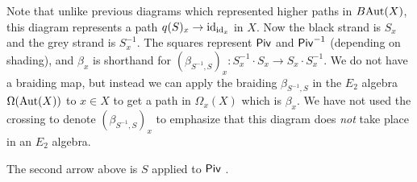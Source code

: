 \documentclass{amsart}
\begin{document}
\begin{constr}
Note that unlike previous diagrams which represented higher paths in $B\mathrm{Aut}(X)$, this diagram represents a path $q(S)_x \rightarrow \mathrm{id}_{\mathrm{id}_x}$ in $X$. Now the black strand is $S_x$ and the grey strand is $S_x^{-1}$. The squares represent $\mathsf{Piv}$ and $\mathsf{Piv}^{-1}$ (depending on shading), and $\beta_x$ is shorthand for $(\beta_{S^{-1},S})_x: S_x^{-1} \cdot S_x \rightarrow S_x \cdot S_x^{-1}$. We do not have a braiding map, but instead we can apply the braiding $\beta_{S^{-1},S}$ in the $E_2$ algebra $\Omega(\mathrm{Aut}(X))$ to $x \in X$ to get a path in $\Omega_x(X)$ which is $\beta_x$. We have not used the crossing to denote $(\beta_{S^{-1},S})_x$ to emphasize that this diagram does \emph{not} take place in an $E_2$ algebra. 


The second arrow above is $S$ applied to $\mathsf{Piv}$ . 



\end{constr}
\end{document}
